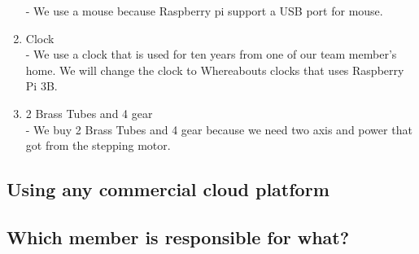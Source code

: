 \documentclass[10pt,a4paper,twocolumn]{report}
\begin{document}
\begin{enumerate}
			- We use a mouse because Raspberry pi support a USB port for mouse. \\
			\item Clock \\
			- We use a clock that is used for ten years from one of our team member’s home. We will change the clock to Whereabouts clocks that uses Raspberry Pi 3B. \\
			\item 2 Brass Tubes and 4 gear \\
			- We buy 2 Brass Tubes and 4 gear because we need two axis and power that got from the stepping motor.\\
		\end{enumerate}
	\subsection{Using any commercial cloud platform}
	\subsection{Which member is responsible for what?}
    
\end{document}
